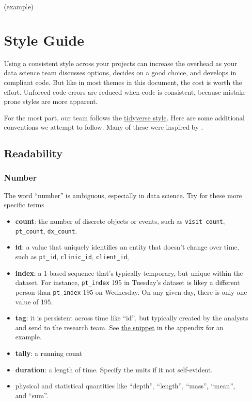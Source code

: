 \documentclass[
]{book}
\providecommand{\tightlist}{%
  \setlength{\itemsep}{0pt}\setlength{\parskip}{0pt}}
\begin{document}
(\href{https://github.com/OuhscBbmc/RedcapExamplesAndPatterns/blob/master/DocumentationGlobal/ResourcesInstallation.md}{example})

\hypertarget{style}{%
\chapter{Style Guide}\label{style}}

Using a consistent style across your projects can increase the overhead as your data science team discusses options, decides on a good choice, and develops in compliant code. But like in most themes in this document, the cost is worth the effort. Unforced code errors are reduced when code is consistent, because mistake-prone styles are more apparent.

For the most part, our team follows the \href{https://style.tidyverse.org/}{tidyverse style}. Here are some additional conventions we attempt to follow. Many of these were inspired by \citep{balena-dimauro}.

\hypertarget{readability}{%
\section{Readability}\label{readability}}

\hypertarget{style-number}{%
\subsection{Number}\label{style-number}}

The word ``number'' is ambiguous, especially in data science. Try for these more specific terms

\begin{itemize}
\tightlist
\item
  \textbf{count}: the number of discrete objects or events, such as \texttt{visit\_count}, \texttt{pt\_count}, \texttt{dx\_count}.
\item
  \textbf{id}: a value that uniquely identifies an entity that doesn't change over time, such as \texttt{pt\_id}, \texttt{clinic\_id}, \texttt{client\_id},
\item
  \textbf{index}: a 1-based sequence that's typically temporary, but unique within the dataset. For instance, \texttt{pt\_index} 195 in Tuesday's dataset is likey a different person than \texttt{pt\_index} 195 on Wednesday. On any given day, there is only one value of 195.
\item
  \textbf{tag}: it is persistent across time like ``id'', but typically created by the analysts and send to the research team. See \protect\hyperlink{snippet-tag}{the snippet} in the appendix for an example.
\item
  \textbf{tally}: a running count
\item
  \textbf{duration}: a length of time. Specify the units if it not self-evident.
\item
  physical and statistical quantities like
  ``depth'',
  ``length'',
  ``mass'',
  ``mean'', and
  ``sum''.
\end{itemize}
\end{document}
